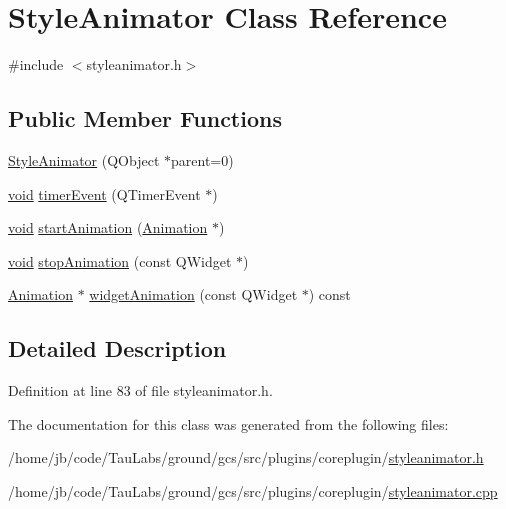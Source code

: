 \hypertarget{class_style_animator}{\section{\-Style\-Animator \-Class \-Reference}
\label{class_style_animator}
}


{\ttfamily \#include $<$styleanimator.\-h$>$}

\subsection*{\-Public \-Member \-Functions}
\begin{DoxyCompactItemize}
\item 
\hyperlink{group___core_plugin_ga44d3b0990bed81996b397c617e80d487}{\-Style\-Animator} (\-Q\-Object $\ast$parent=0)
\item 
\hyperlink{group___u_a_v_objects_plugin_ga444cf2ff3f0ecbe028adce838d373f5c}{void} \hyperlink{group___core_plugin_ga8b1efe3a3fd1210cf5d02289e043c269}{timer\-Event} (\-Q\-Timer\-Event $\ast$)
\item 
\hyperlink{group___u_a_v_objects_plugin_ga444cf2ff3f0ecbe028adce838d373f5c}{void} \hyperlink{group___core_plugin_gae27ca068cc3b68f67b3085e5ff68d975}{start\-Animation} (\hyperlink{class_animation}{\-Animation} $\ast$)
\item 
\hyperlink{group___u_a_v_objects_plugin_ga444cf2ff3f0ecbe028adce838d373f5c}{void} \hyperlink{group___core_plugin_ga7f761734b2694f2b47f29ec5f033140f}{stop\-Animation} (const \-Q\-Widget $\ast$)
\item 
\hyperlink{class_animation}{\-Animation} $\ast$ \hyperlink{group___core_plugin_ga952d425bf52fae5cd5bd54712cd27d82}{widget\-Animation} (const \-Q\-Widget $\ast$) const 
\end{DoxyCompactItemize}


\subsection{\-Detailed \-Description}


\-Definition at line 83 of file styleanimator.\-h.



\-The documentation for this class was generated from the following files\-:\begin{DoxyCompactItemize}
\item 
/home/jb/code/\-Tau\-Labs/ground/gcs/src/plugins/coreplugin/\hyperlink{styleanimator_8h}{styleanimator.\-h}\item 
/home/jb/code/\-Tau\-Labs/ground/gcs/src/plugins/coreplugin/\hyperlink{styleanimator_8cpp}{styleanimator.\-cpp}\end{DoxyCompactItemize}
